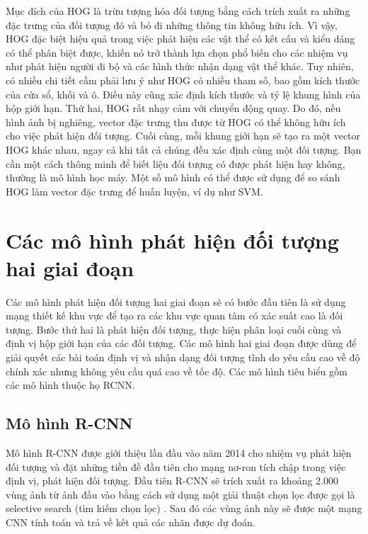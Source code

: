 \documentclass[../the.tex]{subfiles}
\begin{document}
\bigskip

{\fontsize{13}{12} \selectfont

	Mục đích của HOG là trừu tượng hóa đối tượng bằng cách trích xuất ra những đặc trưng của đối tượng đó và bỏ đi những thông tin không hữu ích.
	Vì vậy, HOG đặc biệt hiệu quả trong việc phát hiện các vật thể có kết cấu và kiểu dáng có thể phân biệt được, khiến nó trở thành lựa chọn phổ biến cho các nhiệm vụ như phát hiện người đi bộ và các hình thức nhận dạng vật thể khác.
	Tuy nhiên, có nhiều chi tiết cầm phải lưu ý như HOG có nhiều tham số, bao gồm kích thước của cửa sổ, khối và ô. Điều này cũng xác định kích thước và tỷ lệ khung hình của hộp giới hạn.
	Thứ hai, HOG rất nhạy cảm với chuyển động quay. Do đó, nếu hình ảnh bị nghiêng, vector đặc trưng thu được từ HOG có thể không hữu ích cho việc phát hiện đối tượng.
	Cuối cùng, mỗi khung giới hạn sẽ tạo ra một vector HOG khác nhau, ngay cả khi tất cả chúng đều xác định cùng một đối tượng. Bạn cần một cách thông minh để biết liệu đối tượng có được phát hiện hay không, thường là mô hình học máy.
	Một số mô hình có thể được sử dụng để so sánh HOG làm vector đặc trưng để huấn luyện, ví dụ như SVM.

}

\section{Các mô hình phát hiện đối tượng hai giai đoạn }

 {\fontsize{13}{12} \selectfont

  Các mô hình phát hiện đối tượng hai giai đoạn sẽ có bước đầu tiên là sử dụng mạng thiết kế khu vực để tạo ra các khu vực quan tâm có xác suất cao là đối tượng.
  Bước thứ hai là phát hiện đối tượng, thực hiện phân loại cuối cùng và định vị hộp giới hạn của các đối tượng.
  Các mô hình hai giai đoạn được dùng để giải quyết các bài toán định vị và nhận dạng đối tượng tĩnh do yêu cầu cao về độ chính xác nhưng không yêu cầu quá cao về tốc độ.
  Các mô hình tiêu biểu gồm các mô hình thuộc họ RCNN.

 }

\subsection{Mô hình R-CNN}

{\fontsize{13}{12} \selectfont

	Mô hình R-CNN được giới thiệu lần đầu vào năm 2014 \cite{girshick2014rich} cho nhiệm vụ phát hiện đối tượng và đặt những tiền đề đầu tiên cho mạng nơ-ron tích chập
	trong việc định vị, phát hiện đối tượng. Đầu tiên R-CNN sẽ trích xuất ra khoảng 2.000 vùng ảnh từ ảnh đầu vào bằng cách sử dụng một giải thuật chọn lọc được gọi là selective search (tìm kiếm chọn lọc) \cite{uijlings2013selective}.
	Sau đó các vùng ảnh này sẽ được một mạng CNN tính toán và trả về kết quả các nhãn được dự đoán.

}
\end{document}
